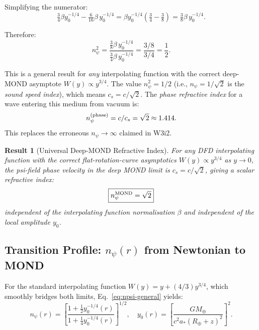 \documentclass[aps,prd,twocolumn,superscriptaddress]{revtex4-2}
\newcommand{\npsi}{n_\psi}
\newcommand{\astar}{a_*}
\newtheorem{result}{Result}
\begin{document}
Simplifying the numerator:
\begin{equation}
\tfrac{3}{4}\beta y_0^{-1/4} - \tfrac{6}{16}\beta\,y_0^{-1/4}
= \beta y_0^{-1/4}\!\left(\tfrac{3}{4} - \tfrac{3}{8}\right)
= \tfrac{3}{8}\beta\,y_0^{-1/4}.
\label{eq:numerator}
\end{equation}

Therefore:
\begin{equation}
\npsi^2 = \frac{\tfrac{3}{8}\beta\,y_0^{-1/4}}{\tfrac{3}{4}\beta\,y_0^{-1/4}}
= \frac{3/8}{3/4} = \frac{1}{2}.
\label{eq:npsi-mond-result}
\end{equation}

\begin{warningbox}
This is a general result for \emph{any} interpolating function with the
correct deep-MOND asymptote $W(y) \propto y^{3/4}$.  The value
$\npsi^2 = 1/2$ (i.e., $\npsi = 1/\sqrt{2}$ is the \emph{sound speed
index}), which means $c_s = c/\sqrt{2}$.  The \emph{phase refractive
index} for a wave entering this medium from vacuum is:
\begin{equation}
\npsi^{(\rm phase)} = c/c_s = \sqrt{2} \approx 1.414.
\end{equation}
This replaces the erroneous $\npsi \to \infty$ claimed in W3i2.
\end{warningbox}

\begin{result}[Universal Deep-MOND Refractive Index]
\label{res:npsi-sqrt2}
For any DFD interpolating function with the correct flat-rotation-curve
asymptotics $W(y) \propto y^{3/4}$ as $y \to 0$, the psi-field phase
velocity in the deep MOND limit is $c_s = c/\sqrt{2}$, giving a
scalar refractive index:
\begin{equation}
\boxed{\npsi^{\rm MOND} = \sqrt{2}}
\label{eq:npsi-result}
\end{equation}
independent of the interpolating function normalisation $\beta$ and
independent of the local amplitude $y_0$.
\end{result}

\subsection{Transition Profile: $\npsi(r)$ from Newtonian to MOND}

For the standard interpolating function
$W(y) = y + (4/3)y^{3/4}$, which smoothly bridges both limits,
Eq.~\eqref{eq:npsi-general} yields:
\begin{equation}
\npsi(r) = \left[\frac{1 + \frac{1}{2}y_0^{-1/4}(r)}{1 + \frac{1}{4}y_0^{-1/4}(r)}\right]^{1/2},
\quad y_0(r) = \left[\frac{GM_\oplus}{c^2\astar(R_\oplus + z)^2}\right]^2.
\label{eq:npsi-profile}
\end{equation}
\end{document}

